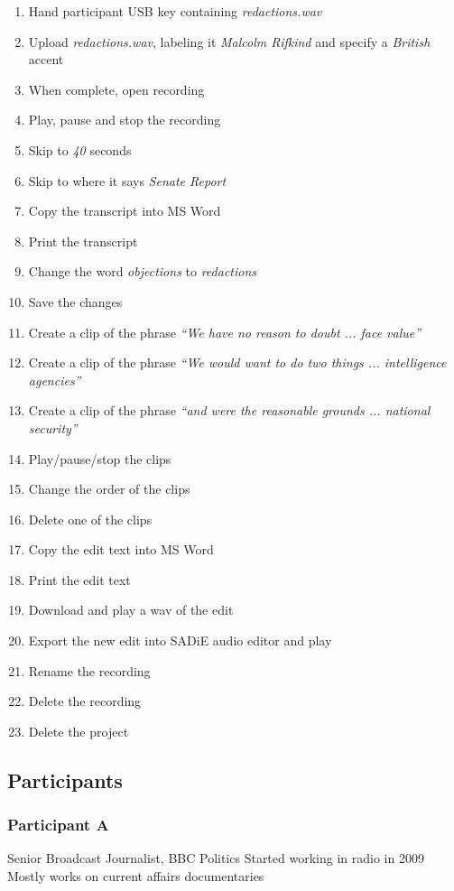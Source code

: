 \begin{enumerate}
\setlength\itemsep{0em}
\item Hand participant USB key containing \textit{redactions.wav}
\item Upload \textit{redactions.wav}, labeling it \textit{Malcolm Rifkind} and
  specify a \textit{British} accent
\item When complete, open recording
\item Play, pause and stop the recording
\item Skip to \textit{40} seconds
\item Skip to where it says \textit{Senate Report}
\item Copy the transcript into MS Word
\item Print the transcript
\item Change the word \textit{objections} to \textit{redactions} 
\item Save the changes
\item Create a clip of the phrase \textit{``We have no reason to doubt ... face
    value''}
\item Create a clip of the phrase \textit{``We would want to do two things ...
    intelligence agencies''}
\item Create a clip of the phrase \textit{``and were the reasonable grounds ...
    national security''}
\item Play/pause/stop the clips
\item Change the order of the clips
\item Delete one of the clips
\item Copy the edit text into MS Word
\item Print the edit text
\item Download and play a wav of the edit
\item Export the new edit into SADiE audio editor and play
\item Rename the recording
\item Delete the recording
\item Delete the project
\end{enumerate}

\subsection{Participants}

\subsubsection{Participant A}
Senior Broadcast Journalist, BBC Politics
Started working in radio in 2009
Mostly works on current affairs documentaries

